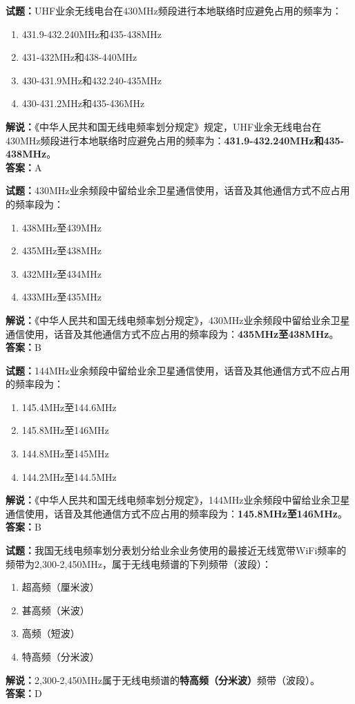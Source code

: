 \documentclass{ctexbook}
\begin{document}
\bigskip


\noindent\textbf{试题：}UHF业余无线电台在430MHz频段进行本地联络时应避免占用的频率为：
\begin{enumerate}[leftmargin=3em]
\item 431.9-432.240MHz和435-438MHz
\item 431-432MHz和438-440MHz
\item 430-431.9MHz和432.240-435MHz
\item 430-431.2MHz和435-436MHz
\end{enumerate}
\noindent\textbf{解说：}《中华人民共和国无线电频率划分规定》规定，UHF业余无线电台在430MHz频段进行本地联络时应避免占用的频率为：\textbf{431.9-432.240MHz和435-438MHz}。\\\noindent\textbf{答案：}A



\bigskip


\noindent\textbf{试题：}430MHz业余频段中留给业余卫星通信使用，话音及其他通信方式不应占用的频率段为：
\begin{enumerate}[leftmargin=3em]
\item 438MHz至439MHz
\item 435MHz至438MHz
\item 432MHz至434MHz
\item 433MHz至435MHz
\end{enumerate}
\noindent\textbf{解说：}《中华人民共和国无线电频率划分规定》，430MHz业余频段中留给业余卫星通信使用，话音及其他通信方式不应占用的频率段为：\textbf{435MHz至438MHz}。\\\noindent\textbf{答案：}B



\bigskip


\noindent\textbf{试题：}144MHz业余频段中留给业余卫星通信使用，话音及其他通信方式不应占用的频率段为：
\begin{enumerate}[leftmargin=3em]
\item 145.4MHz至144.6MHz
\item 145.8MHz至146MHz
\item 144.8MHz至145MHz
\item 144.2MHz至144.5MHz
\end{enumerate}
\noindent\textbf{解说：}《中华人民共和国无线电频率划分规定》，144MHz业余频段中留给业余卫星通信使用，话音及其他通信方式不应占用的频率段为：\textbf{145.8MHz至146MHz}。\\\noindent\textbf{答案：}B


\bigskip


\noindent\textbf{试题：}我国无线电频率划分表划分给业余业务使用的最接近无线宽带WiFi频率的频带为2,300-2,450MHz，属于无线电频谱的下列频带（波段）：
\begin{enumerate}[leftmargin=3em]
\item 超高频（厘米波）
\item 甚高频（米波）
\item 高频（短波）
\item 特高频（分米波）
\end{enumerate}
\noindent\textbf{解说：}2,300-2,450MHz属于无线电频谱的\textbf{特高频（分米波）}频带（波段）。\\\noindent\textbf{答案：}D
\end{document}
